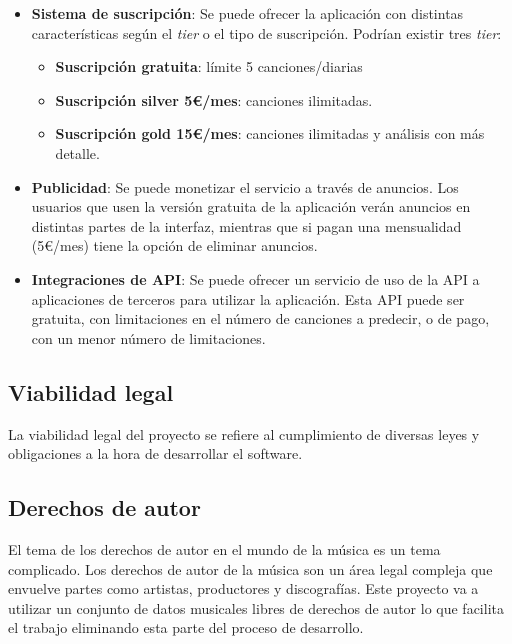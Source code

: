\begin{itemize}
\tightlist

\item \textbf{Sistema de suscripción}: Se puede ofrecer la aplicación con distintas características según el \textit{tier} o el tipo de suscripción. Podrían existir tres \textit{tier}:
	\begin{itemize}
	\tightlist
	\item \textbf{Suscripción gratuita}: límite 5 canciones/diarias

	\item \textbf{Suscripción silver 5€/mes}: canciones ilimitadas.

	\item \textbf{Suscripción gold 15€/mes}: canciones ilimitadas y análisis con más detalle.
	\end{itemize}

\item \textbf{Publicidad}: Se puede monetizar el servicio a través de anuncios. Los usuarios que usen la versión gratuita de la aplicación verán anuncios en distintas partes de la interfaz, mientras que si pagan una mensualidad (5€/mes) tiene la opción de eliminar anuncios.

\item \textbf{Integraciones de API}: Se puede ofrecer un servicio de uso de la API a aplicaciones de terceros para utilizar la aplicación. Esta API puede ser gratuita, con limitaciones en el número de canciones a predecir, o de pago, con un menor número de limitaciones.
\end{itemize}

\subsection{Viabilidad legal}

La viabilidad legal del proyecto se refiere al cumplimiento de diversas leyes y obligaciones a la hora de desarrollar el software.

\subsection{Derechos de autor}

El tema de los derechos de autor en el mundo de la música es un tema complicado. Los derechos de autor de la música son un área legal compleja que envuelve partes como artistas, productores y discografías. Este proyecto va a utilizar un conjunto de datos musicales libres de derechos de autor lo que facilita el trabajo eliminando esta parte del proceso de desarrollo.

